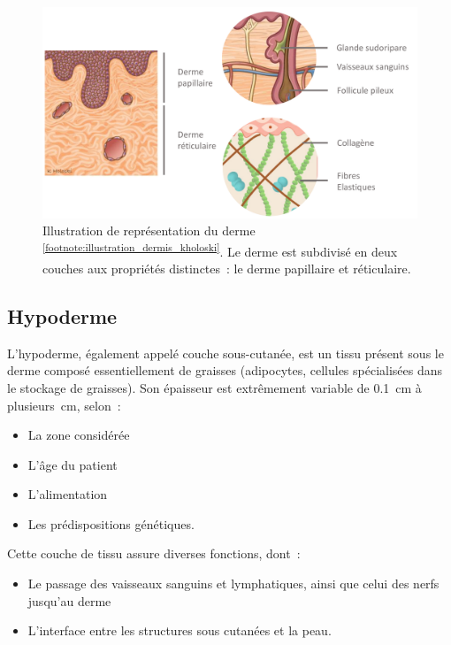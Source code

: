 \begin{figure}[H]
    \centering
    \includegraphics[width=\linewidth]{contents/chapter_1/resources/illustration_dermis_kholoski.pdf}
    \caption{Illustration de représentation du derme \textsuperscript{\ref{footnote:illustration_dermis_kholoski}}. Le derme est subdivisé en deux couches aux propriétés distinctes~: le derme papillaire et réticulaire.}
    \label{fig:illustration_dermis_kholoski}
\end{figure}\par

\addtocounter{footnote}{1}
\clearpage

\subsection{Hypoderme}
L’hypoderme, également appelé couche sous-cutanée, est un tissu présent sous le derme composé essentiellement de graisses (adipocytes, cellules spécialisées dans le stockage de graisses). Son épaisseur est extrêmement variable de \SI{0,1}{\centi\metre} à \SI[parse-numbers = false]{plusieurs}{\centi\metre}, selon~:
\begin{itemize}
\item La zone considérée
\item L’âge du patient
\item L’alimentation
\item Les prédispositions génétiques.
\end{itemize}\par

Cette couche de tissu assure diverses fonctions, dont~:
\begin{itemize}
\item Le passage des vaisseaux sanguins et lymphatiques, ainsi que celui des nerfs jusqu’au derme
\item L’interface entre les structures sous cutanées et la peau.
\end{itemize}\par

